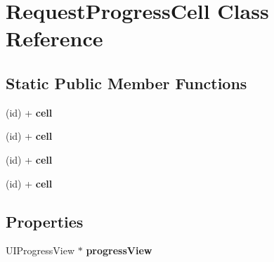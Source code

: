 \hypertarget{interface_request_progress_cell}{
\section{\-Request\-Progress\-Cell \-Class \-Reference}
\label{interface_request_progress_cell}
}
\subsection*{\-Static \-Public \-Member \-Functions}
\begin{DoxyCompactItemize}
\item 
\hypertarget{interface_request_progress_cell_ab90fc1203aeee0aeee1cb9b888c6e873}{
(id) + {\bfseries cell}}
\label{interface_request_progress_cell_ab90fc1203aeee0aeee1cb9b888c6e873}

\item 
\hypertarget{interface_request_progress_cell_ab90fc1203aeee0aeee1cb9b888c6e873}{
(id) + {\bfseries cell}}
\label{interface_request_progress_cell_ab90fc1203aeee0aeee1cb9b888c6e873}

\item 
\hypertarget{interface_request_progress_cell_ab90fc1203aeee0aeee1cb9b888c6e873}{
(id) + {\bfseries cell}}
\label{interface_request_progress_cell_ab90fc1203aeee0aeee1cb9b888c6e873}

\item 
\hypertarget{interface_request_progress_cell_ab90fc1203aeee0aeee1cb9b888c6e873}{
(id) + {\bfseries cell}}
\label{interface_request_progress_cell_ab90fc1203aeee0aeee1cb9b888c6e873}

\end{DoxyCompactItemize}
\subsection*{\-Properties}
\begin{DoxyCompactItemize}
\item 
\hypertarget{interface_request_progress_cell_af65536577727d3ede665560f66b34979}{
\-U\-I\-Progress\-View $\ast$ {\bfseries progress\-View}}
\label{interface_request_progress_cell_af65536577727d3ede665560f66b34979}

\end{DoxyCompactItemize}


